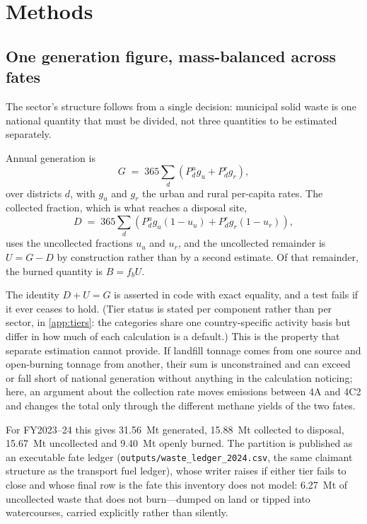 \section{Methods}
\label{sec:methods}

\subsection{One generation figure, mass-balanced across fates}
\label{sec:partition}

The sector's structure follows from a single decision: municipal solid waste is one national
quantity that must be divided, not three quantities to be estimated separately.

Annual generation is
\begin{equation}
G \;=\; 365 \sum_{d} \left( P^{u}_{d} g_{u} + P^{r}_{d} g_{r} \right),
\end{equation}
over districts $d$, with $g_u$ and $g_r$ the urban and rural per-capita rates. The collected
fraction, which is what reaches a disposal site,
\begin{equation}
D \;=\; 365 \sum_{d} \left( P^{u}_{d} g_{u} (1 - u_{u}) + P^{r}_{d} g_{r} (1 - u_{r}) \right),
\end{equation}
uses the uncollected fractions $u_u$ and $u_r$, and the uncollected remainder is $U = G - D$
by construction rather than by a second estimate. Of that remainder, the burned quantity is
$B = f_b U$.

The identity $D + U = G$ is asserted in code with exact equality, and a test fails if it ever
ceases to hold. (Tier status is stated per component rather than per sector, in
\ref{app:tiers}: the categories share one country-specific activity basis but differ in how
much of each calculation is a default.) This is the property that separate estimation cannot provide. If landfill
tonnage comes from one source and open-burning tonnage from another, their sum is unconstrained
and can exceed or fall short of national generation without anything in the calculation
noticing; here, an argument about the collection rate moves emissions between 4A and 4C2 and
changes the total only through the different methane yields of the two fates.

For FY2023--24 this gives \SI{31.56}{\mega\tonne} generated, \SI{15.88}{\mega\tonne} collected to
disposal, \SI{15.67}{\mega\tonne} uncollected and \SI{9.40}{\mega\tonne} openly burned. The
partition is published as an executable fate ledger
(\texttt{outputs/waste\_ledger\_2024.csv}, the same claimant structure as the transport fuel
ledger), whose writer raises if either tier fails to close and whose final row is the fate
this inventory does not model: \SI{6.27}{\mega\tonne} of uncollected waste that does not
burn---dumped on land or tipped into watercourses, carried explicitly rather than silently.

